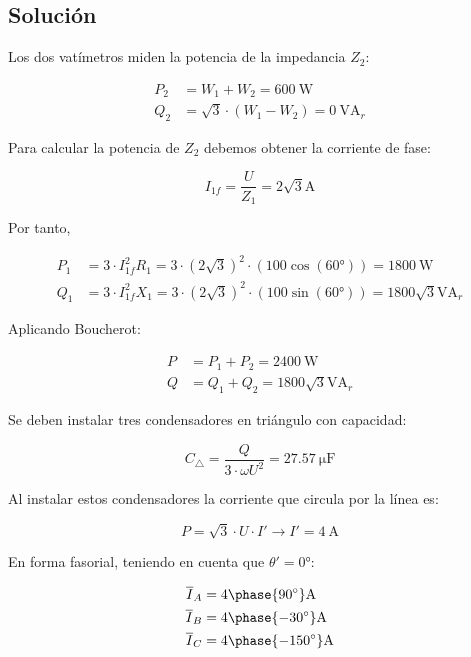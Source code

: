 \subsection*{Solución}

Los dos vatímetros miden la potencia de la impedancia $Z_2$:

\begin{align*}
  P_2 &= W_1 + W_2 = \SI{600}{\watt}\\
  Q_2 &= \sqrt{3}\cdot (W_1 - W_2) = \SI{0}{\volt\ampere_r}
\end{align*}

Para calcular la potencia de $Z_2$ debemos obtener la corriente de fase:

\[
  I_{1f} = \frac{U}{Z_1} = {2\sqrt{3}}\unit{\ampere}
\]

Por tanto,

\begin{align*}
  P_1 &= 3 \cdot I_{1f}^2 R_1 = 3 \cdot (2\sqrt{3})^2 \cdot (100\cos(\ang{60})) = \SI{1800}{\watt}\\
  Q_1 &= 3 \cdot I_{1f}^2 X_1 = 3 \cdot (2\sqrt{3})^2 \cdot (100\sin(\ang{60})) = {1800\sqrt{3}}\unit{\volt\ampere_r}
\end{align*}

Aplicando Boucherot:

\begin{align*}
  P &= P_1 + P_2 = \SI{2400}{\watt}\\
  Q &= Q_1 + Q_2 = {1800\sqrt{3}}\unit{\volt\ampere_r}
\end{align*}

Se deben instalar tres condensadores en triángulo con capacidad:

\[
  C_\triangle = \frac{Q}{3 \cdot \omega U^2} = \SI{27.57}{\micro\farad}
\]

Al instalar estos condensadores la corriente que circula por la línea es:

\[
  P = \sqrt{3} \cdot U \cdot I' \rightarrow I' = \SI{4}{\ampere}
\]

En forma fasorial, teniendo en cuenta que $\theta' = \ang{0}$:

\begin{align*}
  \overline{I}_A &= {4\phase{\ang{90}}}\unit{\ampere}\\
  \overline{I}_B &= {4\phase{\ang{-30}}}\unit{\ampere}\\
  \overline{I}_C &= {4\phase{\ang{-150}}}\unit{\ampere}
\end{align*}





